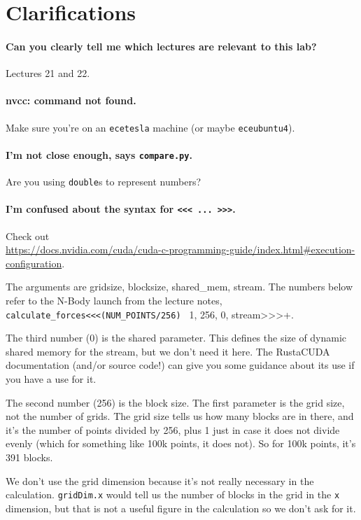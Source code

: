 \section*{Clarifications}

\paragraph{Can you clearly tell me which lectures are relevant to this lab?} Lectures 21 and 22.

\paragraph{nvcc: command not found.} Make sure you're on an \texttt{ecetesla} machine (or maybe \texttt{eceubuntu4}).

\paragraph{I'm not close enough, says \texttt{compare.py}.} Are you using \texttt{double}s to represent numbers?

\paragraph{I'm confused about the syntax for \texttt{<{}<{}< ... >{}>{}>}.} Check out\\
\url{https://docs.nvidia.com/cuda/cuda-c-programming-guide/index.html#execution-configuration}.

The arguments are gridsize, blocksize, shared\_mem, stream. The numbers below refer to the N-Body launch from the lecture notes, \verb+calculate_forces<<<(NUM_POINTS/256) + 1, 256, 0, stream>>>+.

The third number (0) is the shared parameter. This defines the size of dynamic shared memory for the stream, but we don't need it here. The RustaCUDA documentation (and/or source code!) can give you some guidance about its use if you have a use for it.

The second number (256) is the block size. The first parameter is the grid size, not the number of grids. The grid size tells us how many blocks are in there, and it's the number of points divided by 256, plus 1 just in case it does not divide evenly (which for something like 100k points, it does not). So for 100k points, it's 391 blocks.

We don't use the grid dimension because it's not really necessary in the calculation. \texttt{gridDim.x} would tell us the number of blocks in the grid in the \texttt{x} dimension, but that is not a useful figure in the calculation so we don't ask for it.

